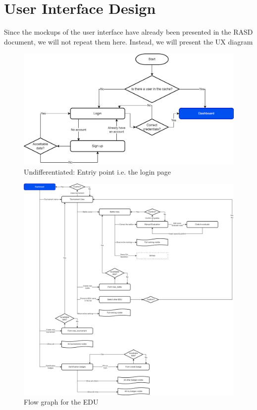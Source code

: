 \chapter{User Interface Design}
Since the mockups of the user interface have already been presented in the RASD document, we will not repeat them here. Instead, we will present the UX diagram

\begin{figure}[H]
    \centering
    \includegraphics[width=\textwidth]{images/UX/UX-Entry_point.drawio.png}
    \caption{Undifferentiated: Entriy point i.e. the login page}
\end{figure}

\begin{figure}[H]
    \centering
    \includegraphics[width=\textwidth]{images/UX/UX-EDU.drawio.png}
    \caption{Flow graph for the EDU}
\end{figure}

